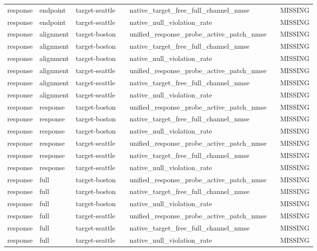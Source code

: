 \begin{longtable}{lllllll}
response & endpoint & target-seattle &  & native\_target\_free\_full\_channel\_nmse &  & MISSING \\
response & endpoint & target-seattle &  & native\_null\_violation\_rate &  & MISSING \\
response & alignment & target-boston &  & unified\_response\_probe\_active\_patch\_nmse &  & MISSING \\
response & alignment & target-boston &  & native\_target\_free\_full\_channel\_nmse &  & MISSING \\
response & alignment & target-boston &  & native\_null\_violation\_rate &  & MISSING \\
response & alignment & target-seattle &  & unified\_response\_probe\_active\_patch\_nmse &  & MISSING \\
response & alignment & target-seattle &  & native\_target\_free\_full\_channel\_nmse &  & MISSING \\
response & alignment & target-seattle &  & native\_null\_violation\_rate &  & MISSING \\
response & response & target-boston &  & unified\_response\_probe\_active\_patch\_nmse &  & MISSING \\
response & response & target-boston &  & native\_target\_free\_full\_channel\_nmse &  & MISSING \\
response & response & target-boston &  & native\_null\_violation\_rate &  & MISSING \\
response & response & target-seattle &  & unified\_response\_probe\_active\_patch\_nmse &  & MISSING \\
response & response & target-seattle &  & native\_target\_free\_full\_channel\_nmse &  & MISSING \\
response & response & target-seattle &  & native\_null\_violation\_rate &  & MISSING \\
response & full & target-boston &  & unified\_response\_probe\_active\_patch\_nmse &  & MISSING \\
response & full & target-boston &  & native\_target\_free\_full\_channel\_nmse &  & MISSING \\
response & full & target-boston &  & native\_null\_violation\_rate &  & MISSING \\
response & full & target-seattle &  & unified\_response\_probe\_active\_patch\_nmse &  & MISSING \\
response & full & target-seattle &  & native\_target\_free\_full\_channel\_nmse &  & MISSING \\
response & full & target-seattle &  & native\_null\_violation\_rate &  & MISSING \\
\bottomrule
\end{longtable}
